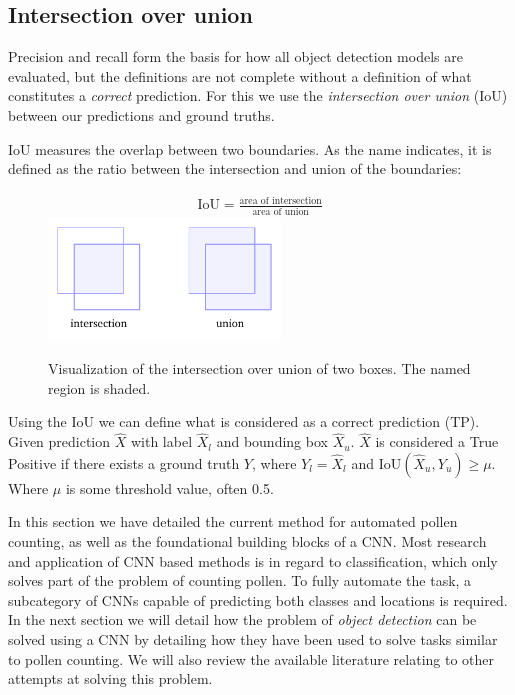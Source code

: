 \subsection{Intersection over union}

Precision and recall form the basis for how all object detection models are evaluated, but the definitions are not complete without a definition of what constitutes a \textit{correct} prediction.
For this we use the \textit{intersection over union} (IoU) between our predictions and ground truths.

IoU measures the overlap between two boundaries.
As the name indicates, it is defined as the ratio between the intersection and union of the boundaries:

\begin{figure}[htb]
  \centering
  \begin{gather*}
    \text{IoU}=\frac{\text{area of intersection}}{\text{area of union}}
  \end{gather*}
  \includegraphics[width=0.55\textwidth]{figs/iou.pdf}
\caption[Intersection over union]{Visualization of the intersection over union of two boxes.
The named region is shaded.}\label{fig:iou}
\end{figure}

Using the IoU we can define what is considered as a correct prediction (TP).
Given prediction \(\hat{X}\) with label \(\hat{X}_l\) and bounding box \(\hat{X}_u\). \(\hat{X}\) is considered a True Positive if there exists a ground truth \(Y\), where \(Y_{l}=\hat{X}_l\) and \(\text{IoU}(\hat{X}_u, Y_{u})\ge \mu \).
Where \( \mu \) is some threshold value, often 0.5.


In this section we have detailed the current method for automated pollen counting, as well as the foundational building blocks of a CNN\@.
Most research and application of CNN based methods is in regard to classification, which only solves part of the problem of counting pollen.
To fully automate the task, a subcategory of CNNs capable of predicting both classes and locations is required.
In the next section we will detail how the problem of \textit{object detection} can be solved using a CNN by detailing how they have been used to solve tasks similar to pollen counting.
We will also review the available literature relating to other attempts at solving this problem.


